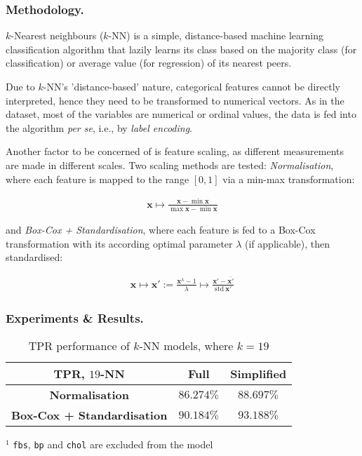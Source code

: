 
\subsubsection{Methodology.}

\( k \)-Nearest neighbours (\( k \)-NN) is a simple, distance-based machine learning classification algorithm that lazily learns its class based on the majority class (for classification) or average value (for regression) of its nearest peers.

Due to \( k \)-NN's 'distance-based' nature, categorical features cannot be directly interpreted, hence they need to be transformed to numerical vectors. As in the dataset, most of the variables are numerical or ordinal values, the data is fed into the algorithm \textit{per se}, i.e., by \textit{label encoding}.

Another factor to be concerned of is feature scaling, as different measurements are made in different scales. Two scaling methods are tested: \textit{Normalisation}, where each feature is mapped to the range \( [0, 1] \) via a min-max transformation:

\begin{align*}
    \mathbf{x} \mapsto \frac{\mathbf x - \min\mathbf x}{\max\mathbf x - \min\mathbf x}
\end{align*}

and \textit{Box-Cox + Standardisation}, where each feature is fed to a Box-Cox transformation with its according optimal parameter \( \lambda \) (if applicable), then standardised:

\begin{align*}
    \mathbf{x} 
        \mapsto \mathbf{x'} := \frac{\mathbf{x}^\lambda - 1}\lambda  
        \mapsto \frac{\mathbf x' - \overline{\mathbf x'}}{\mathrm{std\ }\mathbf x'}
\end{align*}

\subsubsection{Experiments \& Results.}

\begin{table}[h]
    \centering
    \begin{tabular}{ccc}
        \toprule
        TPR, \( 19 \)-NN
        & \textbf{Full}
        & \textbf{Simplified\footnotemark{}}
        \\
        \midrule
        \textbf{Normalisation}
        & \( 86.274\% \)    
        & \( 88.697\% \)
        \\
        \midrule
        \textbf{Box-Cox + Standardisation}
        & \( 90.184\% \)    
        & \( 93.188\% \)
        \\
        \bottomrule
    \end{tabular}
    
    \raggedright
    \( ^1 \) {\small \texttt{fbs}, \texttt{bp} and \texttt{chol} are excluded from the model}
    
    \centering
    \vspace{4pt}
    \caption{\centering TPR performance of \( k \)-NN models, where \( k = 19 \)}
\end{table}


